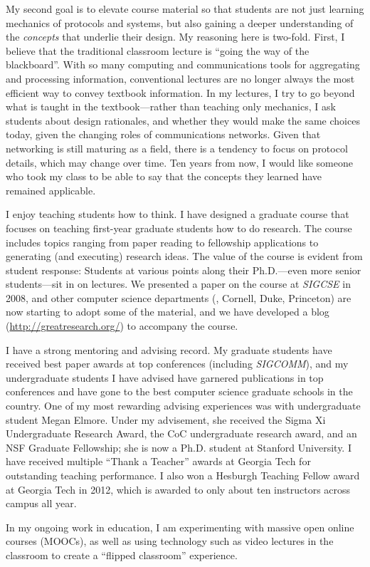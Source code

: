 My second goal is to elevate course material so that students are not
just learning mechanics of protocols and systems, but also gaining a
deeper understanding of the {\em concepts} that underlie their design.
My reasoning here is two-fold.  First, I believe that the traditional
classroom lecture is ``going the way of the blackboard''.  With so many
computing and communications tools for aggregating and processing
information, conventional lectures are no longer always the most
efficient way to convey textbook information.  In my lectures, I try to
go beyond what is taught in the textbook---rather than teaching only
mechanics, I ask students about design rationales, and whether they
would make the same choices today, given the changing roles of
communications networks.  Given that networking is still
maturing as a field, there is a tendency to focus on protocol details,
which may change over time.  Ten years from now, I would like someone
who took my class to be able to say that the concepts they learned have
remained applicable.  

I enjoy teaching students how to think.  I have designed
a graduate course that focuses on teaching first-year graduate students
how to do research.  The course includes topics ranging from paper
reading to fellowship applications to generating (and executing)
research ideas. The value of the course is evident from student
response: Students at various points along their Ph.D.---even more
senior students---sit in on lectures.  We presented a paper on the
course at {\em SIGCSE} in 2008, and other computer science departments
(\eg, Cornell, Duke, Princeton) are now starting to adopt some of the
material, and we have developed a blog (\url{http://greatresearch.org/})
to accompany the course.

I have a strong mentoring and advising record.  My graduate students
have received best paper awards at top conferences (including {\em
SIGCOMM}), and my undergraduate students I have advised have garnered
publications in top conferences and have gone to the best computer
science graduate schools in the country.  One of my most rewarding
advising experiences was with undergraduate student Megan Elmore.  Under
my advisement, she received the Sigma Xi Undergraduate Research Award,
the CoC undergraduate research award, and an NSF Graduate Fellowship;
she is now a Ph.D. student at Stanford University. I have received
multiple ``Thank a Teacher'' awards at Georgia Tech for outstanding
teaching performance.  I also won a Hesburgh Teaching Fellow award at
Georgia Tech in 2012, which is awarded to only about ten instructors
across campus all year.

In my ongoing work in education, I am experimenting with massive open
online courses (MOOCs), as well as using technology such as video
lectures in the classroom to create a ``flipped classroom'' experience.  
